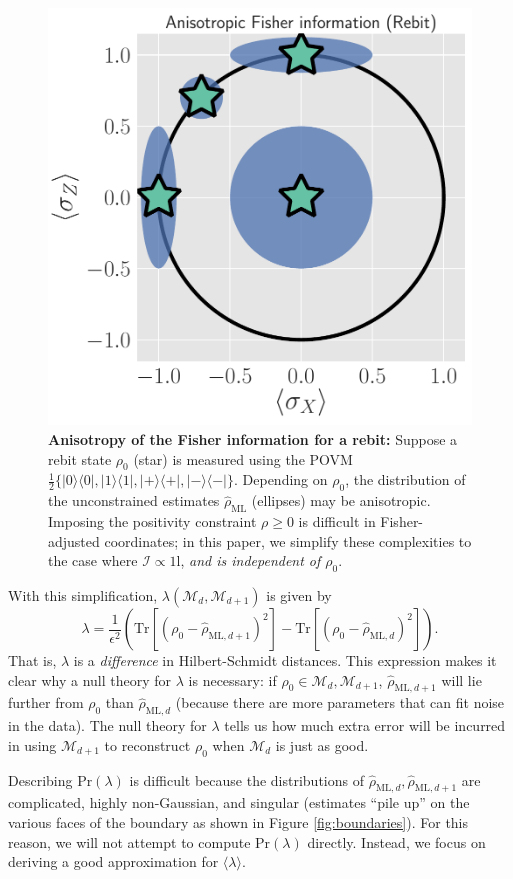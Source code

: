 \documentclass[aps,pra, twocolumn]{revtex4-1}
\newcommand{\M}{\mathcal{M}}
\newcommand{\Id}{\mathbb{I}}
\def\Id{1\!\mathrm{l}}
\newcommand{\rhohat}{\hat{\rho}}
\newcommand{\rhoML}[1]{\rhohat_{\scriptscriptstyle{\mathrm{ML},#1}}}
\begin{document}
\begin{figure}
\centering
\includegraphics[width=.75\columnwidth]{Images/Figure_5.pdf}
 \caption{\textbf{Anisotropy of the Fisher information for a rebit:} Suppose a rebit state $\rho_{0}$ (star) is measured using the POVM $\frac{1}{2}\{|0\rangle\langle 0|, |1\rangle\langle 1|, |+\rangle\langle +|, |-\rangle\langle -|\}$. Depending on $\rho_{0}$, the distribution of the unconstrained estimates $\hat{\rho}_{\mathrm{ML}}$ (ellipses) may be anisotropic. Imposing the positivity constraint $\rho \geq 0$ is difficult in Fisher-adjusted coordinates; in this paper, we simplify these complexities to the case where $\mathcal{I} \propto \Id$, \emph{and is independent of $\rho_{0}$}.}
\label{fig:anisofi}
\end{figure}

With this simplification, $\lambda(\M_{d},\M_{d+1})$ is given by
\begin{equation}
\label{eq:llrs_split}
\lambda = \frac{1}{\epsilon^{2}}\left(\mathrm{Tr}[(\rho_{0} - \rhoML{d+1})^{2}] -  \mathrm{Tr}[(\rho_{0} - \rhoML{d})^{2}]\right).
\end{equation}
That is, $\lambda$ is a \emph{difference} in Hilbert-Schmidt distances. This expression makes it clear why a null theory for $\lambda$ is necessary: if $\rho_{0} \in \M_{d},\M_{d+1}$, $\rhoML{d+1}$ will lie further from $\rho_{0}$ than $\rhoML{d}$ (because there are more parameters that can fit noise in the data). The null theory for $\lambda$ tells us how much extra error will be incurred in using $\M_{d+1}$ to reconstruct $\rho_{0}$ when $\M_{d}$ is just as good.

Describing $\mathrm{Pr}(\lambda)$ is difficult because the distributions of $\rhoML{d}, \rhoML{d+1}$ are complicated, highly non-Gaussian, and singular (estimates ``pile up'' on the various faces of the boundary as shown in Figure \ref{fig:boundaries}).  For this reason, we will not attempt to compute $\mathrm{Pr}(\lambda)$ directly.  Instead, we focus on deriving a good approximation for $\langle \lambda \rangle$.
\end{document}
